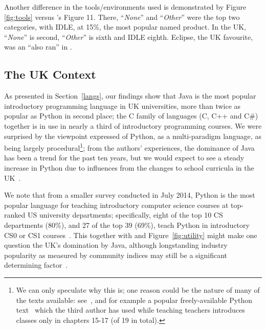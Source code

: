 \documentclass[english]{programming}
\begin{document}
Another difference in the tools/environments used is demonstrated by
Figure \ref{fig:tools} versus \cite{mason+cooper:2014}'s Figure
11. There, ``{\emph{None}}'' and ``{\emph{Other}}'' were the top two
categories, with IDLE, at 15\%, the most popular named product. In the
UK, ``{\emph{None}}'' is second, ``{\emph{Other}}'' is sixth and IDLE
eighth. Eclipse, the UK favourite, was an ``also ran'' in
\cite{mason+cooper:2014}.

\subsection{The UK Context}

As presented in Section~\ref{langs}, our findings show that Java is
the most popular introductory programming language in UK universities,
more than twice as popular as Python in second place; the C family of
languages (C, C++ and C\#) together is in use in nearly a third of
introductory programming courses. We were surprised by the viewpoint
expressed of Python, as a multi-paradigm language, as being largely
procedural\footnote{We can only speculate why this is; one reason
could be the nature of many of the texts available:
see~\cite{McMaster2016java}, and for example a popular
freely-available Python text~\cite{Downey2012a} which the third author
has used while teaching teachers introduces classes only in chapters
15-17 (of 19 in total).}; from the authors' experiences, the dominance
of Java has been a trend for the past ten years, but we would expect
to see a steady increase in Python due to influences from the changes
to school curricula in the UK~\cite{brown-et-al-toce2014}.

We note that from a smaller survey conducted in July 2014, Python is
the most popular language for teaching introductory computer science
courses at top-ranked US university departments; specifically, eight
of the top 10 CS departments (80\%), and 27 of the top 39 (69\%),
teach Python in introductory CS0 or CS1 courses~\cite{guo:2014}.  This
together with \cite{mason+cooper:2014} and Figure~\ref{fig:utility}
might make one question the UK's domination by Java, although
longstanding industry popularity as measured by community indices may
still be a significant determining factor~\cite{tiobe:nov2016}.
\end{document}
